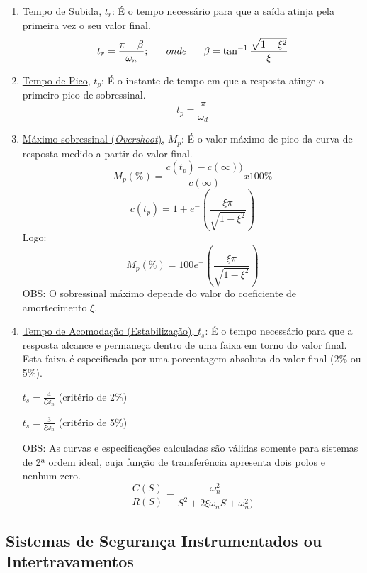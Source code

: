 \begin{enumerate}
    \item \underline{Tempo de Subida}, \textbf{\(t_r\)}: É o tempo necessário para que a saída atinja pela primeira vez o seu valor final.
    \newline
    \[t_r=\frac{\pi-\beta}{\omega_n}; \hspace{4ex} onde \hspace{4ex} \beta=\tan^{-1}\frac{\sqrt{1-\xi^2}}{\xi}\]
    \newline
    \item \underline{Tempo de Pico}, \textbf{\(t_p\)}: É o instante de tempo em que a resposta atinge o primeiro pico de sobressinal.
    \[t_p=\frac{\pi}{\omega_d}\]
    \newline
    \item \underline{Máximo sobressinal (\textit{Overshoot})}, \textbf{\(M_p\)}: É o valor máximo de pico da curva de resposta medido a partir do valor final.
    \[M_p(\%)=\frac{c(t_p)-c(\infty))}{c(\infty)}x100\%\]
    \[c(t_p)=1+e^-({\frac{\xi\pi}{\sqrt{1-\xi^2}}})\]
    Logo: \newline
    \[M_p(\%)=100e^-({\frac{\xi\pi}{\sqrt{1-\xi^2}}})\]
    OBS: O sobressinal máximo depende do valor do coeficiente de amortecimento \(\xi\).
    \newline
    \item \underline{Tempo de Acomodação (Estabilização), \(t_s\)}: É o tempo necessário para que a resposta alcance e permaneça dentro de uma faixa em torno do valor final. Esta faixa é especificada por uma porcentagem absoluta do valor final (2\% ou 5\%). \newline
    
    \hspace{25ex}\(t_s=\frac{4}{\xi\omega_n}\) \hspace{10ex} (critério de 2\%) \newline
    
    \hspace{25ex}\(t_s=\frac{3}{\xi\omega_n}\) \hspace{10ex} (critério de 5\%)\newline
    
OBS: As curvas e especificações calculadas são válidas somente para sistemas de 2ª ordem ideal, cuja função de transferência apresenta dois polos e nenhum zero.
    \[\frac{C(S)}{R(S)}=\frac{\omega_n^2}{S^2+2\xi\omega_nS+\omega_n^2)}\]
\end{enumerate}

\subsection{Sistemas de Segurança Instrumentados ou Intertravamentos}

